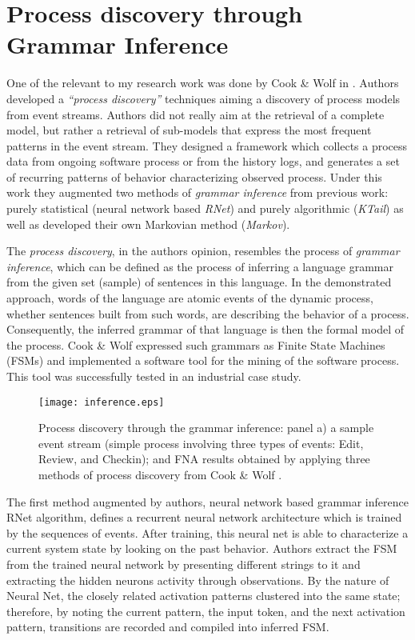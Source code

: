 \section{Process discovery through Grammar Inference} \label{grammar}
One of the relevant to my research work was done by Cook \& Wolf in \cite{citeulike:328044}. Authors developed a \textit{``process discovery''} techniques aiming a discovery of process models from event streams. Authors did not really aim at the retrieval of a complete model, but rather a retrieval of sub-models that express the most frequent patterns in the event stream. They designed a framework which collects a process data from ongoing software process or from the history logs, and generates a set of recurring patterns of behavior characterizing observed process. Under this work they augmented two methods of \textit{grammar inference} from previous work: purely statistical (neural network based \textit{RNet}) and purely algorithmic (\textit{KTail}) as well as developed their own Markovian method (\textit{Markov}). 

The \textit{process discovery}, in the authors opinion, resembles the process of \textit{grammar inference}, which can be defined as the process of inferring a language grammar from the given set (sample) of sentences in this language. In the demonstrated approach, words of the language are atomic events of the dynamic process, whether sentences built from such words, are describing the behavior of a process. Consequently, the inferred grammar of that language is then the formal model of the process. Cook \& Wolf expressed such grammars as Finite State Machines (FSMs) and implemented a software tool for the mining of the software process. This tool was successfully tested in an industrial case study.

\begin{figure}[tbp]
   \centering
   \texttt{[image: inference.eps]}
   \caption{Process discovery through the grammar inference: panel a) a sample event stream (simple process involving three types of events: Edit, Review, and Checkin); and FNA results obtained by applying three methods of process discovery from Cook \& Wolf \cite{citeulike:328044}.}
   \label{fig:inference}
\end{figure}

The first method augmented by authors, neural network based grammar inference RNet algorithm, defines a recurrent neural network architecture which is trained by the sequences of events. After training, this neural net is able to characterize a current system state by looking on the past behavior. Authors extract the FSM from the trained neural network by presenting different strings to it and extracting the hidden neurons activity through observations. By the nature of Neural Net, the closely related activation patterns clustered into the same state; therefore, by noting the current pattern, the input token, and the next activation pattern, transitions are recorded and compiled into inferred FSM.

